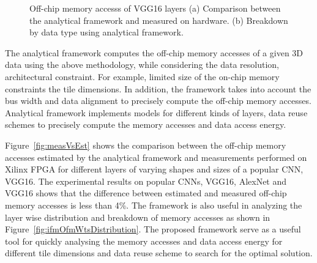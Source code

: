\documentclass[a4paper,10pt]{article}
\begin{document}
\begin{figure}[!htb]
	\centering
    \captionsetup{font=sf}
	\hfil
	\hfil   
	\caption{Off-chip memory accesss of VGG16 layers (a) Comparison between the analytical framework and measured on hardware. (b) Breakdown by data type using analytical framework.}
	\label{fig:nnLayerData}
\end{figure}
The analytical framework computes the off-chip memory accesses of a given 3D data using the above methodology, while considering the data resolution, architectural constraint. For example, limited size of the on-chip memory constraints the tile dimensions.  In addition, the framework takes into account the bus width and data alignment to precisely compute the off-chip memory accesses. Analytical framework implements models for different kinds of layers, data reuse schemes to precisely compute the memory accesses and data access energy. 

Figure~\ref{fig:measVsEst} shows the comparison between the off-chip memory accesses estimated by the analytical framework and measurements performed on Xilinx FPGA for different layers of varying shapes and sizes of a popular CNN, VGG16. The experimental results on popular CNNs, VGG16, AlexNet and VGG16 shows that the difference between estimated and measured off-chip memory accesses is less than 4\%. The framework is also useful in analyzing the layer wise distribution and breakdown of memory accesses as shown in Figure~\ref{fig:ifmOfmWtsDistribution}. The proposed framework serve as a useful tool for quickly analysing the memory accesses and data access energy for different tile dimensions and data reuse scheme to search for the optimal solution. 
\end{document}
